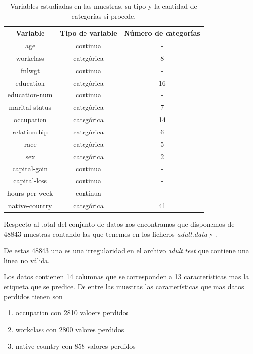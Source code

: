 \documentclass[a4paper,11pt]{article}
\begin{document}
\begin{table}[h!]
    \centering
    \begin{tabular}{|c|c|c|}
    \hline
    Variable & Tipo de variable & Número de categorías\\ \hline
    age & continua & - \\ \hline
    workclass & categórica & 8 \\ \hline
    fnlwgt & continua & - \\ \hline
    education & categórica & 16 \\ \hline
    education-num & continua & - \\ \hline
    marital-status & categórica & 7 \\ \hline
    occupation & categórica & 14 \\ \hline
    relationship & categórica & 6 \\ \hline
    race & categórica & 5 \\ \hline
    sex & categórica & 2 \\ \hline
    capital-gain & continua & - \\ \hline
    capital-loss & continua & - \\ \hline
    hours-per-week & continua & - \\ \hline
    native-country & categórica & 41 \\ \hline
\end{tabular}
\caption{Variables estudiadas en las muestras, su tipo y la cantidad de categorías si procede.}
\end{table}

Respecto al total del conjunto de datos nos encontramos que disponemos de
48843 muestras contando las que tenemos en los ficheros \textit{adult.data}
y . 

De estas 48843 una es una irregularidad en el archivo \textit{adult.test} que contiene 
una linea no válida.

Los datos contienen 14 columnas que se corresponden a 13 características mas 
la etiqueta que se predice. De entre las muestras las características que mas datos
perdidos tienen son 

\begin{enumerate}
    \item occupation con 2810 valoers perdidos
    \item workclass con 2800 valores perdidos 
    \item native-country con 858 valores perdidos 
\end{enumerate}
\end{document}
